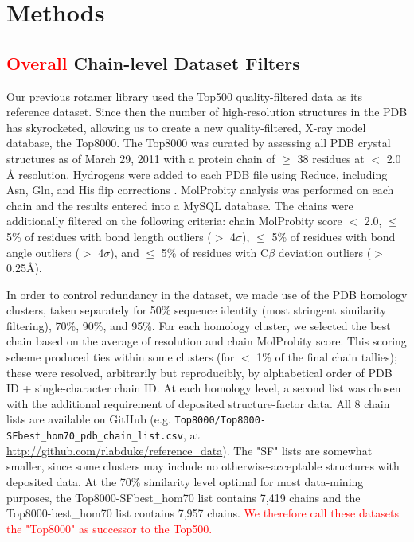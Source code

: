 \section{Methods}
\subsection{\textcolor{red}{Overall} Chain-level Dataset Filters}
Our previous rotamer library \cite{lovell2000penultimate} used the Top500 quality-filtered data \citep{Lovell:2003uq} as its reference dataset. Since then the number of high-resolution structures in the PDB has skyrocketed, allowing us to create a new quality-filtered, X-ray model database, the Top8000. The Top8000 was curated by assessing all PDB crystal structures as of March 29, 2011 with a protein chain of $\ge$ 38 residues at $<$ 2.0 \AA{} resolution. Hydrogens were added to each PDB file using Reduce, including Asn, Gln, and His flip corrections \citep{Word19991735}. MolProbity analysis was performed on each chain \citep{Chen:2010kx} and the results entered into a MySQL database. The chains were additionally filtered on the following criteria: chain MolProbity score $<$ 2.0, $\le$ 5\% of residues with bond length outliers ($>$ 4$\sigma$), $\le$ 5\% of residues with bond angle outliers ($>$ 4$\sigma$), and $\le$ 5\% of residues with C$\beta$ deviation outliers ($>$ 0.25\AA{}).

In order to control redundancy in the dataset, we made use of the PDB homology clusters, taken separately for 50\% sequence identity (most stringent similarity filtering), 70\%, 90\%, and 95\%. For each homology cluster, we selected the best chain based on the average of resolution and chain MolProbity score. This scoring scheme produced ties within some clusters (for $<$ 1\% of the final chain tallies); these were resolved, arbitrarily but reproducibly, by alphabetical order of PDB ID + single-character chain ID. At each homology level, a second list was chosen with the additional requirement of deposited structure-factor data. All 8 chain lists are available on GitHub \citep{Dabbish:2012} (e.g. \texttt{Top8000/Top8000-SFbest\_hom70\_pdb\_chain\_list.csv}, at \url{http://github.com/rlabduke/reference_data}). The "SF" lists are somewhat smaller, since some clusters may include no otherwise-acceptable structures with deposited data. At the 70\% similarity level optimal for most data-mining purposes, the Top8000-SFbest\_hom70 list contains 7,419 chains and the Top8000-best\_hom70 list contains 7,957 chains. \textcolor{red}{We therefore call these datasets the "Top8000" as successor to the Top500.}

